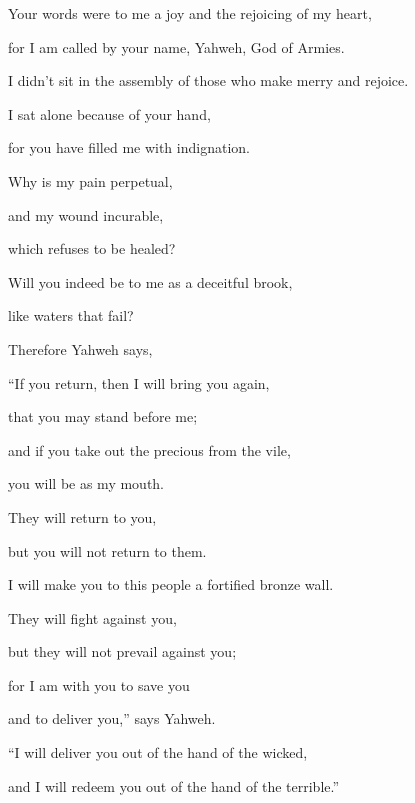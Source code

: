 {\par }{\Q Your words were to me a joy and the rejoicing of my heart,
\par }{\QB for I am called by your name, Yahweh, God of Armies.
\par }{\Q {}I didn’t sit in the assembly of those who make merry and rejoice.
\par }{\QB I sat alone because of your hand,
\par }{\QB for you have filled me with indignation.
\par }{\Q {}Why is my pain perpetual,
\par }{\QB and my wound incurable,
\par }{\QB which refuses to be healed?
\par }{\Q Will you indeed be to me as a deceitful brook,
\par }{\QB like waters that fail?
\par }{\PP {}Therefore Yahweh says,
\par }{\Q “If you return, then I will bring you again,
\par }{\QB that you may stand before me;
\par }{\Q and if you take out the precious from the vile,
\par }{\QB you will be as my mouth.
\par }{\Q They will return to you,
\par }{\QB but you will not return to them.
\par }{\Q {}I will make you to this people a fortified bronze wall.
\par }{\QB They will fight against you,
\par }{\QB but they will not prevail against you;
\par }{\Q for I am with you to save you
\par }{\QB and to deliver you,” says Yahweh.
\par }{\Q {}“I will deliver you out of the hand of the wicked,
\par }{\QB and I will redeem you out of the hand of the terrible.”

}
